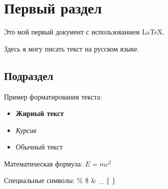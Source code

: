 \documentclass{article}
\begin{document}
\section{Первый раздел}

Это мой первый документ с использованием LaTeX.

Здесь я могу писать текст на русском языке.

\subsection{Подраздел}

Пример форматирования текста:
\begin{itemize}
    \item \textbf{Жирный текст}
    \item \textit{Курсив}
    \item Обычный текст
\end{itemize}

Математическая формула: $E = mc^2$

Специальные символы: \% \$ \& \_ \{ \}
\end{document}
